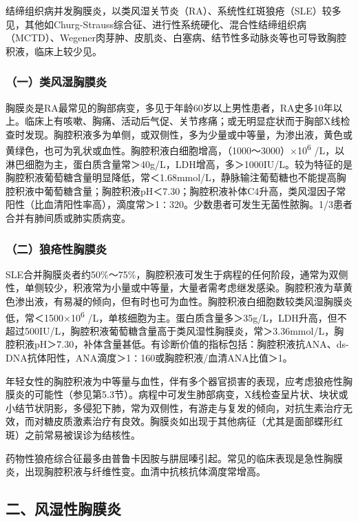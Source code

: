 结缔组织病并发胸膜炎，以类风湿关节炎（RA）、系统性红斑狼疮（SLE）较多见，其他如Churg-Strauss综合征、进行性系统硬化、混合性结缔组织病（MCTD）、Wegener肉芽肿、皮肌炎、白塞病、结节性多动脉炎等也可导致胸腔积液，临床上较少见。

\subsubsection{（一）类风湿胸膜炎}

胸膜炎是RA最常见的胸部病变，多见于年龄60岁以上男性患者，RA史多10年以上。临床上有咳嗽、胸痛、活动后气促、关节疼痛；或无明显症状而于胸部X线检查时发现。胸腔积液多为单侧，或双侧性，多为少量或中等量，为渗出液，黄色或黄绿色，也可为乳状或血性。胸腔积液白细胞增高，（1000～3000）×10\textsuperscript{6}
/L，以淋巴细胞为主，蛋白质含量常＞40g/L，LDH增高，多＞1000IU/L。较为特征的是胸腔积液葡萄糖含量明显降低，常＜1.68mmol/L，静脉输注葡萄糖也不能提高胸腔积液中葡萄糖含量；胸腔积液pH＜7.30；胸腔积液补体C4升高，类风湿因子常阳性（比血清阳性率高），滴度常＞1∶320。少数患者可发生无菌性脓胸。1/3患者合并有肺间质或肺实质病变。

\subsubsection{（二）狼疮性胸膜炎}

SLE合并胸膜炎者约50\%～75\%，胸腔积液可发生于病程的任何阶段，通常为双侧性，单侧较少，积液常为小量或中等量，大量者需考虑继发感染。胸腔积液为草黄色渗出液，有易凝的倾向，但有时也可为血性。胸腔积液白细胞数较类风湿胸膜炎低，常＜1500×10\textsuperscript{6}
/L，单核细胞为主。蛋白质含量多＞35g/L，LDH升高，但不超过500IU/L，胸腔积液葡萄糖含量高于类风湿性胸膜炎，常＞3.36mmol/L，胸腔积液pH＞7.30，补体含量甚低。有诊断价值的指标包括：胸腔积液抗ANA、ds-DNA抗体阳性，ANA滴度＞1∶160或胸腔积液/血清ANA比值＞1。

年轻女性的胸腔积液为中等量与血性，伴有多个器官损害的表现，应考虑狼疮性胸膜炎的可能性（参见第5.3节）。病程中可发生肺部病变，X线检查呈片状、块状或小结节状阴影，多侵犯下肺，常为双侧性，有游走与复发的倾向，对抗生素治疗无效，而对糖皮质激素治疗有良效。胸膜炎如出现于其他病征（尤其是面部蝶形红斑）之前常易被误诊为结核性。

药物性狼疮综合征最多由普鲁卡因胺与肼屈嗪引起。常见的临床表现是急性胸膜炎，出现胸腔积液与纤维性变。血清中抗核抗体滴度常增高。

\subsection{二、风湿性胸膜炎}

